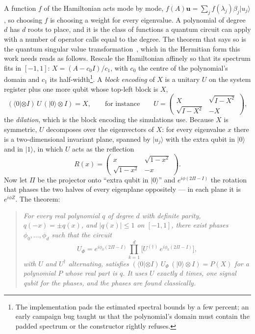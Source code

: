 \documentclass[11pt,a4paper]{article}
\begin{document}
A function $f$ of the Hamiltonian acts mode by mode, $f(A)\mathbf{u}=
\sum_j f(\lambda_j)\beta_j|u_j\rangle$, so choosing $f$ is choosing a
weight for every eigenvalue. A polynomial of degree $d$ has $d$ roots to
place, and it is the class of functions a quantum circuit can apply with a
number of operator calls equal to the degree. The theorem that says so is
the quantum singular value transformation~\cite{gslw2019}, which in the
Hermitian form this work needs reads as follows. Rescale the Hamiltonian
affinely so that its spectrum fits in $[-1,1]$: $X=(A-c_0I)/c_1$, with
$c_0$ the centre of the polynomial's domain and $c_1$ its
half-width\footnote{The implementation pads the estimated spectral bounds
by a few percent; an early campaign bug taught us that the polynomial's
domain must contain the padded spectrum or the constructor rightly
refuses.}. A \emph{block encoding} of $X$ is a unitary $U$ on the system
register plus one more qubit whose top-left block is $X$,
\begin{equation}
(\langle0|\otimes I)\,U\,(|0\rangle\otimes I)=X,
\qquad\text{for instance}\qquad
U=\begin{pmatrix} X & \sqrt{I-X^{2}}\\[2pt] \sqrt{I-X^{2}} & -X
\end{pmatrix},
\label{eq:dilation}
\end{equation}
the \emph{dilation}, which is the block encoding the simulations use.
Because $X$ is symmetric, $U$ decomposes over the eigenvectors of $X$: for
every eigenvalue $x$ there is a two-dimensional invariant plane, spanned by
$|u_j\rangle$ with the extra qubit in $|0\rangle$ and in $|1\rangle$, in
which $U$ acts as the reflection
\begin{equation}
R(x)=\begin{pmatrix} x & \sqrt{1-x^{2}}\\ \sqrt{1-x^{2}} & -x\end{pmatrix}.
\label{eq:eigenplane}
\end{equation}
Now let $\Pi$ be the projector onto ``extra qubit in $|0\rangle$'' and
$e^{i\phi(2\Pi-I)}$ the rotation that phases the two halves of every
eigenplane oppositely --- in each plane it is $e^{i\phi Z}$. The theorem:
\begin{quote}
\emph{For every real polynomial $q$ of degree $d$ with definite parity,
$q(-x)=\pm q(x)$, and $|q(x)|\le1$ on $[-1,1]$, there exist phases
$\phi_0,\dots,\phi_d$ such that the circuit}
\begin{equation}
U_{\Phi}=e^{i\phi_0(2\Pi-I)}\prod_{k=1}^{d}\Big[U^{(\dagger)}\,e^{i\phi_k(2\Pi-I)}\Big],
\label{eq:qsvt}
\end{equation}
\emph{with $U$ and $U^{\dagger}$ alternating, satisfies
$(\langle0|\otimes I)\,U_{\Phi}\,(|0\rangle\otimes I)=P(X)$ for a
polynomial $P$ whose real part is $q$. It uses $U$ exactly $d$ times, one
signal qubit for the phases, and the phases are found classically.}
\end{quote}
\end{document}

